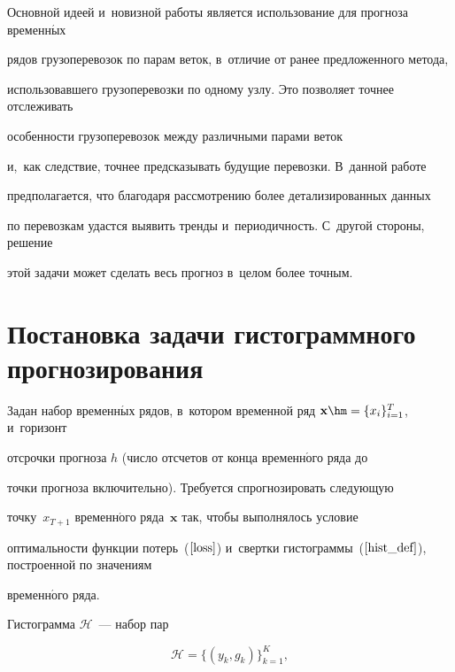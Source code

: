 Основной идеей и~новизной работы является использование для прогноза временн$\acute{\mbox{ы}}$х


рядов грузоперевозок по парам веток, в~отличие от ранее предложенного метода,


использовавшего грузоперевозки по одному узлу. Это позволяет точнее отслеживать


особенности грузоперевозок между различными парами веток


и,~как следствие, точнее предсказывать будущие перевозки. В~данной работе


предполагается, что благодаря рассмотрению более детализированных данных


по перевозкам удастся выявить тренды и~периодичность. С~другой стороны, решение


этой задачи может сделать весь прогноз в~целом более точным.





\section{ Постановка задачи гистограммного прогнозирования}





Задан набор временн$\acute{\mbox{ы}}$х рядов, в~котором временной ряд $\mathbf{x} \hm=


\{x_i\}_{i=1}^T$, и~горизонт


отсрочки прогноза $h$ (число отсчетов от конца временн$\acute{\mbox{о}}$го ряда до


точки прогноза включительно). Требуется спрогнозировать следующую


точку~$x_{T+1}$ временн$\acute{\mbox{о}}$го ряда~$\mathbf{x}$ так, чтобы выполнялось условие


оптимальности функции потерь~($\ref{loss}$) и~свертки гистограммы~($\ref{hist_def}$), построенной по значениям


временн$\acute{\mbox{о}}$го ряда.





Гистограмма $\mathcal{H}$~--- набор пар


\begin{equation}


\label{hist_def}


\mathcal{H} = \{(y_k,g_k)\}_{k=1}^K,


\end{equation}


